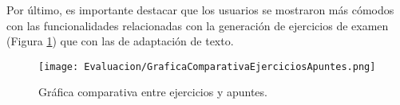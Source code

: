 Por último, es importante destacar que los usuarios se mostraron más cómodos con las funcionalidades relacionadas con la generación de ejercicios de examen (Figura \ref{fig:graficaComparativaEjerciciosApuntes}) que con las de adaptación de texto.

\begin{figure}[H]
    \centering
    \texttt{[image: Evaluacion/GraficaComparativaEjerciciosApuntes.png]}
    \caption{Gráfica comparativa entre ejercicios y apuntes.}
    \label{fig:graficaComparativaEjerciciosApuntes}
\end{figure}